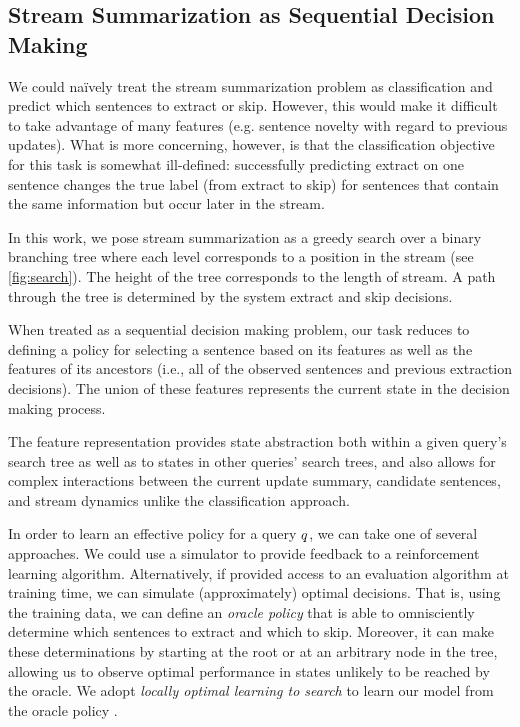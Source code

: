 \subsection{Stream Summarization as Sequential Decision Making}

We could na{\"i}vely treat the stream summarization problem as classification
and predict which sentences to extract or skip. However, this would make it
difficult to take advantage of many features (e.g. sentence novelty with
regard to previous updates).  What is more concerning, however, is that the
classification objective for this task is somewhat ill-defined: successfully
predicting extract on one sentence changes the true label (from extract to
skip) for sentences that contain the same information but occur later in the
stream.
 
In this work, we pose stream summarization as a greedy search over a binary
branching tree where each level corresponds to a position in the stream (see
\autoref{fig:search}).  The height of the tree corresponds to the length of
stream.  A path through the tree is determined by the system extract and skip
decisions.
 


When treated as a sequential decision making problem, our task reduces to
defining a policy for selecting a sentence based on its features as well as
the features of its ancestors (i.e., all of the observed sentences and
previous extraction decisions).  The union of these features represents the
current state in the decision making process. 

The feature representation provides state abstraction both within a given
query's search tree as well as to states in other queries' search trees, and
also allows for complex interactions between the current update summary,
candidate sentences, and stream dynamics unlike the classification approach.

In order to learn an effective policy for a query $q$, we can take one of
several approaches.  We could use a simulator to provide feedback to a
reinforcement learning algorithm.  Alternatively, if provided access to an
evaluation algorithm at training time, we can simulate (approximately) optimal
decisions. That is, using the training data, we can define an \emph{oracle
policy} that is able to omnisciently determine which sentences to extract and
which to skip.  Moreover, it can make these determinations by starting at the
root or at an arbitrary node in the tree, allowing us to observe optimal
performance in states unlikely to be reached by the oracle.  We adopt
\textit{locally optimal learning to search} to learn our model from the oracle
policy \citep{chang2015}.  



